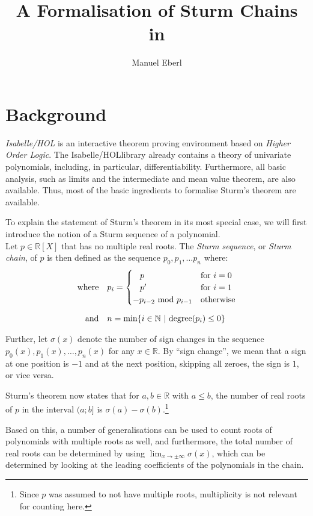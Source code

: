 \documentclass[11pt,a4paper,oneside]{article}
\title{A Formalisation of Sturm Chains in \isabellehol}
\author{Manuel Eberl}
\newcommand{\RR}{\mathbb{R}}
\newcommand{\NN}{\mathbb{N}}
\newcommand{\isabellehol}{\mbox{Isabelle}\slash HOL}
\begin{document}
\maketitle
\vskip-3mm

\section{Background}

\emph{\isabellehol} is an interactive theorem proving environment based on 
\emph{Higher Order Logic}. The \isabellehol library already contains a 
theory of univariate polynomials, including, in particular, differentiability. 
Furthermore, all basic analysis, such as limits and the intermediate and mean value 
theorem, are also available. Thus, most of the basic ingredients to 
formalise Sturm's theorem are available.

To explain the statement of Sturm's theorem in its most special case, 
we will first introduce the notion of a Sturm sequence of a polynomial.\\
Let $p\in\RR[X]$ that has no multiple real roots. The \emph{Sturm sequence}, 
or \emph{Sturm chain}, of $p$ is then defined as the sequence 
$p_0,p_1,\ldots p_n$ where:
\begin{align*}
&&\mathrm{where}\quad &p_i = \begin{cases}
\hskip3mm p & \mathrm{for}\ i = 0\\
\hskip3mm p' & \mathrm{for}\ i = 1\\
-p_{i-2}\ \mathrm{mod}\ p_{i-1} &\mathrm{otherwise}
\end{cases}&\\[2mm]
&&\mathrm{and}\quad &n=\mathrm{min} \{i\in\NN\ |\ \mathrm{degree}(p_i) \leq 0\}&
\end{align*}

Further, let $\sigma(x)$ denote the number of sign changes in the sequence 
$p_0(x), p_1(x), \ldots, p_n(x)$ for any $x \in \RR$. 
By \enquote{sign change}, we mean that a sign at one position is $-1$ and at the 
next position, skipping all zeroes, the sign is $1$, or vice versa.

Sturm's theorem now states that for $a,b\in\RR$ with $a\leq b$, the number of 
real roots of $p$ in the interval $(a;b]$ is $\sigma(a)-\sigma(b)$.\footnote{
Since $p$ was assumed to not have multiple roots, multiplicity is not relevant 
for counting here.}

Based on this, a number of generalisations can be used to count roots of 
polynomials with multiple roots as well, and furthermore, the total number of 
real roots can be determined by using $\lim_{x\to\pm\infty} \sigma(x)$, which 
can be determined by looking at the leading coefficients of the polynomials in 
the chain.
\end{document}
